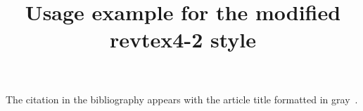 \documentclass{revtex4-2}
\begin{document}
\title{Usage example for the modified revtex4-2 style}
\maketitle

The citation in the bibliography appears with the article title formatted in gray~\cite{ExampleCitation}.


\end{document}
